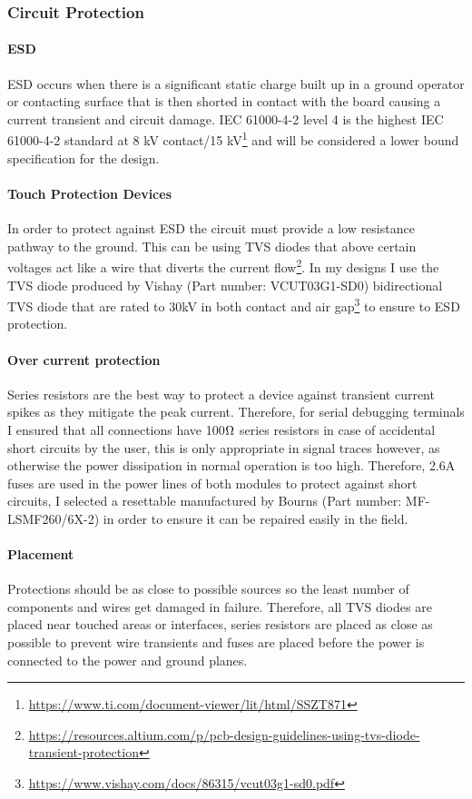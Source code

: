 \subsubsection{Circuit Protection}\label{sub_sub_section:tgt_circuit_protection}
\paragraph{\gls{ESD}}
\gls{ESD} occurs when there is a significant static charge built up in a ground operator or contacting surface that is then shorted in contact with the board causing a current transient and circuit damage. IEC 61000-4-2 level 4 is the highest IEC 61000-4-2 standard at 8 kV contact/15 kV\footnote{\url{https://www.ti.com/document-viewer/lit/html/SSZT871}} and will be considered a lower bound specification for the design. 
\paragraph{Touch Protection Devices}
In order to protect against \gls{ESD} the circuit must provide a low resistance pathway to the ground. This can be using \gls{TVS} diodes that above certain voltages act like a wire that diverts the current flow\footnote{\url{https://resources.altium.com/p/pcb-design-guidelines-using-tvs-diode-transient-protection}}. In my designs I use the \gls{TVS} diode produced by Vishay (Part number: VCUT03G1-SD0) bidirectional \gls{TVS} diode that are rated to 30kV in both contact and air gap\footnote{\url{https://www.vishay.com/docs/86315/vcut03g1-sd0.pdf}} to ensure to \gls{ESD} protection. 
\paragraph{Over current protection}
Series resistors are the best way to protect a device against transient current spikes as they mitigate the peak current. Therefore, for serial debugging terminals I ensured that all connections have 100$\ohm$ series resistors in case of accidental short circuits by the user, this is only appropriate in signal traces however, as otherwise the power dissipation in normal operation is too high. Therefore, 2.6A fuses are used in the power lines of both modules to protect against short circuits, I selected a resettable manufactured by Bourns (Part number: MF-LSMF260/6X-2) in order to ensure it can be repaired easily in the field. 
\paragraph{Placement}
Protections should be as close to possible sources so the least number of components and wires get damaged in failure. Therefore, all \gls{TVS} diodes are placed near touched areas or interfaces, series resistors are placed as close as possible to prevent wire transients and fuses are placed before the power is connected to the power and ground planes.

